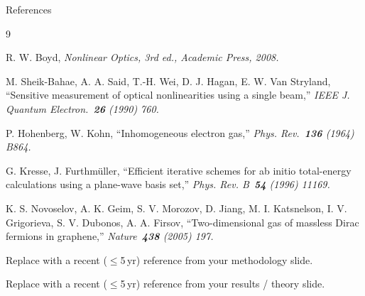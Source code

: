\begin{frame}[allowframebreaks]{References}
  \begin{thebibliography}{9}

    R. W. Boyd,
    \itshape Nonlinear Optics,
    3rd ed., Academic Press, 2008.

    M. Sheik-Bahae, A. A. Said, T.-H. Wei, D. J. Hagan, E. W. Van Stryland,
    ``Sensitive measurement of optical nonlinearities using a single beam,''
    \itshape IEEE J. Quantum Electron.\ \textbf{26} (1990) 760.

    P. Hohenberg, W. Kohn,
    ``Inhomogeneous electron gas,''
    \itshape Phys. Rev.\ \textbf{136} (1964) B864.

    G. Kresse, J. Furthm\"uller,
    ``Efficient iterative schemes for ab initio total-energy calculations
    using a plane-wave basis set,''
    \itshape Phys. Rev. B\ \textbf{54} (1996) 11169.

    K. S. Novoselov, A. K. Geim, S. V. Morozov, D. Jiang, M. I. Katsnelson,
    I. V. Grigorieva, S. V. Dubonos, A. A. Firsov,
    ``Two-dimensional gas of massless Dirac fermions in graphene,''
    \itshape Nature\ \textbf{438} (2005) 197.

    Replace with a recent ($\le$5\,yr) reference from your methodology slide.

    Replace with a recent ($\le$5\,yr) reference from your results / theory
    slide.

  \end{thebibliography}
\end{frame}
